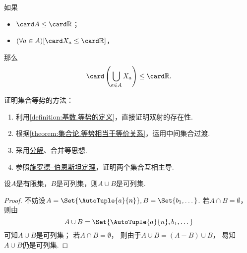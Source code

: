 \begin{proposition}
如果\begin{itemize}
	\item \(\card A \leq \card\mathbb{R}\)；
	\item \((\forall a \in A)
	[\card X_a \leq \card\mathbb{R}]\)，
\end{itemize}
那么\[
	\card\left( \bigcup_{a \in A} X_a \right) \leq \card\mathbb{R}.
\]
\end{proposition}

证明集合等势的方法：\begin{enumerate}
	\item 利用\cref{definition:基数.等势的定义}，直接证明双射的存在性.
	\item 根据\cref{theorem:集合论.等势相当于等价关系}，运用中间集合过渡.
	\item 采用\hyperref[theorem:基数.集合在映射下的分解]{分解}、合并等思想.
	\item 参照\hyperref[theorem:集合论.施罗德--伯恩斯坦定理]{施罗德--伯恩斯坦定理}，证明两个集合互相主导.
\end{enumerate}

\begin{example}
设\(A\)是有限集，\(B\)是可列集，则\(A \cup B\)是可列集.
\begin{proof}
不妨设\(A = \Set{\AutoTuple{a}{n}},
B = \Set{b_1,\dotsc}\).
若\(A \cap B = \emptyset\)，
则由\begin{equation*}
	A \cup B = \Set{\AutoTuple{a}{n},b_1,\dotsc}
\end{equation*}
可知\(A \cup B\)是可列集；
若\(A \cap B = \emptyset\)，
则由于\(A \cup B = (A-B) \cup B\)，
易知\(A \cup B\)仍是可列集.
\end{proof}
\end{example}
